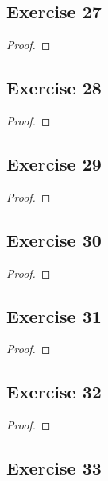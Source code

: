 \documentclass[14pt]{extarticle}
\begin{document}
\subsection{Exercise 27}

\begin{proof}

\end{proof}

\subsection{Exercise 28}

\begin{proof}

\end{proof}

\subsection{Exercise 29}

\begin{proof}

\end{proof}

\subsection{Exercise 30}

\begin{proof}

\end{proof}

\subsection{Exercise 31}

\begin{proof}

\end{proof}

\subsection{Exercise 32}

\begin{proof}

\end{proof}

\subsection{Exercise 33}
\end{document}

